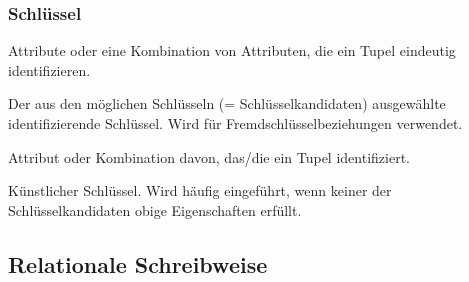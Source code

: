     \subsubsection{Schlüssel}
    \begin{description}
    \setlength{\itemsep}{0pt}    
        \item[Schlüssel] Attribute oder eine Kombination von Attributen, die ein Tupel eindeutig identifizieren.
        \item[Primärschlüssel] Der aus den möglichen Schlüsseln (= Schlüsselkandidaten) ausgewählte identifizierende Schlüssel. Wird für Fremdschlüsselbeziehungen verwendet.
        \item[Schlüsselkandidat] Attribut oder Kombination davon, das/die ein Tupel identifiziert.
        \item[Surrogatschlüssel] Künstlicher Schlüssel. Wird häufig eingeführt, wenn keiner der Schlüsselkandidaten obige Eigenschaften erfüllt.
    \end{description}
    \subsection{Relationale Schreibweise}
